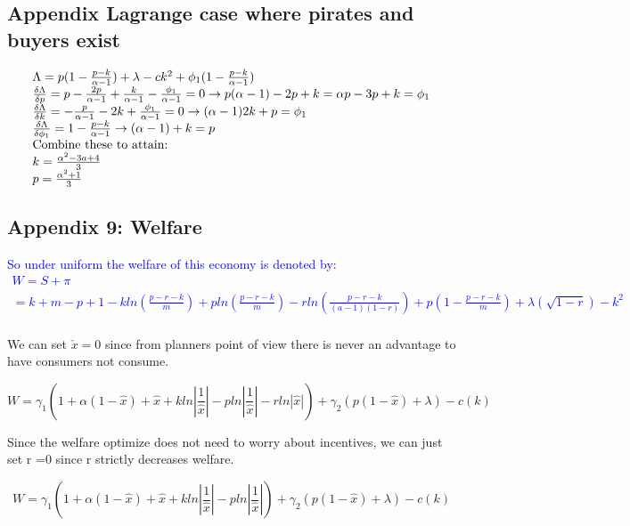 \documentclass{article}
\begin{document}
\subsection{Appendix Lagrange case where pirates and buyers exist }
\[
\begin{array}{ll}
\Lambda = p(1-\frac{p-k}{\alpha-1})+\lambda-ck^2+\phi_1(1-\frac{p-k}{\alpha-1})  \\

\frac{\delta \Lambda}{\delta p} = p-\frac{2p}{\alpha-1}+\frac{k}{\alpha-1}-\frac{\phi_1}{\alpha-1}=0 
\rightarrow p(\alpha-1)-2p+k=\alpha p - 3p+k=\phi_1\\

\frac{\delta \Lambda}{\delta k} = -\frac{p}{\alpha-1} - 2k+\frac{\phi_1}{\alpha-1}=0 
\rightarrow (\alpha-1)2k+p=\phi_1\\ 

\frac{\delta \Lambda}{\delta \phi_1} =1-\frac{p-k}{\alpha-1}
\rightarrow (\alpha-1)+k=p\\

\textnormal{Combine these to attain:}\\ 
k = \frac{\alpha^2-3a+4}{3} \\
p = \frac{\alpha^2+1}{3}
\end{array}
\]


\subsection{Appendix 9: Welfare}
\textcolor{blue}{
So under uniform the welfare of this economy is denoted by: 
\[
\begin{array}{ll}
W
= S + \pi \\
=  k+m-p + 1 - kln(\frac{p-r-k}{m})+pln (\frac{p-r-k}{m})-r ln (\frac{p-r-k}{(a-1)(1-r)}) + p(1-\frac{p-r-k}{m}) + \lambda (\sqrt{1-r})-k^2 \\
\end{array} 
\]}

We can set $\check{x}=0$ since from planners point of view there is never an advantage to have consumers not consume. 

\[
W =\gamma_1(1+ \alpha(1 - \hat{x}) + \hat{x}
 + kln|\frac{1}{\hat{x}}| - pln|\frac{1}{\hat{x}}| 
 - rln|\hat{x}|)
+ \gamma_2(p(1-\hat{x})+\lambda) - c(k)
\]

Since the welfare optimize does not need to worry about incentives, we can just set r =0 since r strictly decreases welfare.  

\[
W =\gamma_1(1+ \alpha(1 - \hat{x}) + \hat{x}
 + kln|\frac{1}{\hat{x}}| - pln|\frac{1}{\hat{x}}| )
+ \gamma_2(p(1-\hat{x})+\lambda) - c(k)
\]
\end{document}
